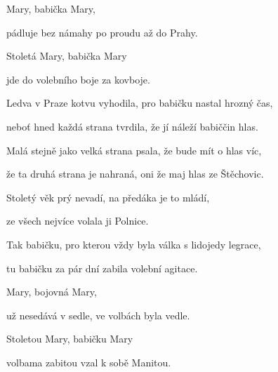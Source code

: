\zr
Mary, babička Mary, 

pádluje bez námahy po proudu až do Prahy. 

Stoletá Mary, babička Mary 

jde do volebního boje za kovboje. 
\kr

\zs
Ledva v Praze kotvu vyhodila, pro babičku nastal hrozný čas, 

neboť hned každá strana tvrdila, že jí náleží babiččin hlas. 

\bigskip

Malá stejně jako velká strana psala, že bude mít o hlas víc, 

že ta druhá strana je nahraná, oni že maj hlas ze Štěchovic. 

\bigskip

Stoletý věk prý nevadí, na předáka je to mládí, 

ze všech nejvíce volala ji Polnice. 

\bigskip

Tak babičku, pro kterou vždy byla válka s lidojedy legrace, 

tu babičku za pár dní zabila volební agitace. 
\ks

\zr
Mary, bojovná Mary, 

už nesedává v sedle, ve volbách byla vedle. 

Stoletou Mary, babičku Mary 

volbama zabitou vzal k sobě Manitou.
\kr
\kp

